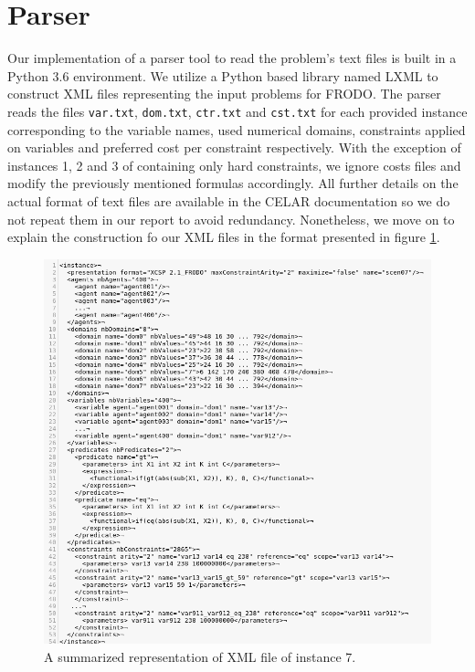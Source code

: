 \documentclass{article}
\begin{document}
	\section{Parser}
	Our implementation of a parser tool to read the problem's text files is built in a Python 3.6 environment. We utilize a Python based library named LXML\cite{lxml} to construct XML files representing the input problems for FRODO. The parser reads the files \texttt{var.txt}, \texttt{dom.txt}, \texttt{ctr.txt} and \texttt{cst.txt} for each provided instance corresponding to the variable names, used numerical domains, constraints applied on variables and preferred cost per constraint respectively. With the exception of instances 1, 2 and 3 of containing only hard constraints, we ignore costs files and modify the previously mentioned formulas accordingly. All further details on the actual format of text files are available in the CELAR documentation so we do not repeat them in our report to avoid redundancy. Nonetheless, we move on to explain the construction fo our XML files in the format presented in figure \ref{file_format}.
	\begin{figure}
		\centering
		\includegraphics[scale=0.5]{figure/xml.png}
		\caption{A summarized representation of XML file of instance 7.}
		\label{file_format}
	\end{figure}
\end{document}
